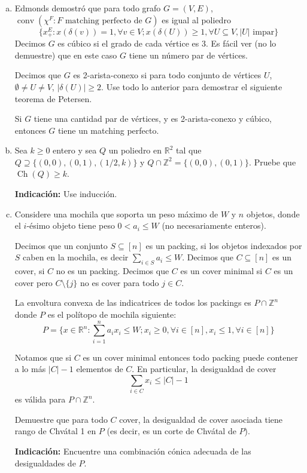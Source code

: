 \documentclass{article}
\newcommand{\RR}{\mathbb R}
\newcommand{\ZZ}{\mathbb Z}
\newcommand{\conv}{\operatorname{conv}}
\newcommand{\Ch}{\operatorname{Ch}}
\theoremstyle{plain}
\theoremstyle{definition}
\theoremstyle{Azul}
\begin{document}
\begin{enumerate}[(a)]
\item Edmonds demostró que para todo grafo $G=(V,E)$, 
$\conv(\chi^F\colon F \text{ matching perfecto de $G$})$ es igual al poliedro $$\{x^E_+\colon x(\delta(v))=1, \forall v\in V; x(\delta(U))\geq 1, \forall U\subseteq V, |U|\text{ impar}\}$$
Decimos $G$ es cúbico si el grado de cada vértice es 3. Es fácil ver (no lo demuestre) que en este caso $G$ tiene un número par de vértices.

Decimos que $G$ es 2-arista-conexo si para todo conjunto de vértices $U$, $\emptyset\neq U\neq V$, $|\delta(U)|\geq 2$. Use todo lo anterior para demostrar el siguiente teorema de Petersen.

Si $G$ tiene una cantidad par de vértices, y es 2-arista-conexo y cúbico, entonces $G$ tiene un matching perfecto.


\item 
Sea $k\geq 0$ entero y sea $Q$ un poliedro en $\RR^2$ tal que $Q\supseteq \{(0,0),(0,1),(1/2,k)\}$ y $Q\cap \ZZ^2=\{(0,0),(0,1)\}$. Pruebe que $\Ch(Q)\geq k$.

\textbf{Indicación:} Use inducción.


\item Considere una mochila que soporta un peso máximo de $W$ y $n$ objetos, donde el $i$-ésimo objeto tiene peso $0< a_i\leq W$ (no necesariamente enteros).

Decimos que un conjunto $S\subseteq [n]$ es un packing, si los objetos indexados por $S$ caben en la mochila, es decir $\sum_{i\in S}a_i \leq W$. Decimos que $C\subseteq [n]$ es un cover, si $C$ no es un packing. Decimos que $C$ es un cover minimal si $C$ es un cover pero $C\setminus\{j\}$ no es cover para todo $j\in C$.

La envoltura convexa de las indicatrices de todos los packings es $P\cap \ZZ^n$ donde $P$ es el polítopo de mochila siguiente:
$$P=\{x\in \RR^n\colon \sum_{i=1}^na_ix_i \leq W; x_i \geq 0, \forall i\in [n], x_i\leq 1, \forall i\in [n]\}$$

Notamos que si $C$ es un cover minimal entonces todo packing puede contener a lo más $|C|-1$ elementos de $C$. En particular, la desigualdad de cover 
$$\sum_{i\in C}x_i \leq |C|-1$$ 
es válida para $P\cap \ZZ^n$.

Demuestre que para todo $C$ cover, la desigualdad de cover asociada tiene rango de Chvátal 1 en $P$ (es decir, es un corte de Chvátal de $P$).

\textbf{Indicación:} Encuentre una combinación cónica adecuada de las desigualdades de $P$.


\end{enumerate}
\end{document}
